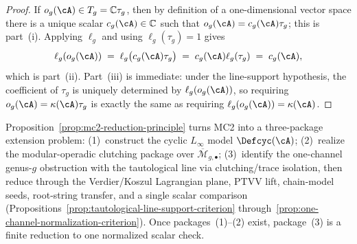 \begin{proof}
If $o_g(\cA)\in T_g=\mathbb{C}\tau_g$, then by definition of a
one-dimensional vector space there is a unique scalar
$c_g(\cA)\in\mathbb{C}$ such that
$o_g(\cA)=c_g(\cA)\tau_g$; this is part~\textup{(i)}.
Applying $\ell_g$ and using $\ell_g(\tau_g)=1$ gives
\[
\ell_g(o_g(\cA))
\;=\;
\ell_g\bigl(c_g(\cA)\tau_g\bigr)
\;=\;
c_g(\cA)\ell_g(\tau_g)
\;=\;
c_g(\cA),
\]
which is part~\textup{(ii)}.
Part~\textup{(iii)} is immediate: under the line-support hypothesis,
the coefficient of $\tau_g$ is uniquely determined by
$\ell_g(o_g(\cA))$, so requiring
$o_g(\cA)=\kappa(\cA)\tau_g$ is exactly the same as requiring
$\ell_g(o_g(\cA))=\kappa(\cA)$.
\end{proof}

\begin{remark}
\label{rem:mc2-reduction-consequence}
Proposition~\ref{prop:mc2-reduction-principle} turns MC2 into a
three-package extension problem:
(1)~construct the cyclic $L_\infty$ model $\Defcyc(\cA)$;
(2)~realize the modular-operadic clutching package over
$\overline{\mathcal{M}}_{g,\bullet}$;
(3)~identify the one-channel genus-$g$ obstruction with the
tautological line via clutching/trace isolation, then reduce
through the Verdier/Koszul Lagrangian plane, PTVV lift,
chain-model seeds, root-string transfer, and a single scalar
comparison
(Propositions~\ref{prop:tautological-line-support-criterion}
through~\ref{prop:one-channel-normalization-criterion}).
Once packages~(1)--(2) exist, package~(3) is a finite
reduction to one normalized scalar check.
\end{remark}

